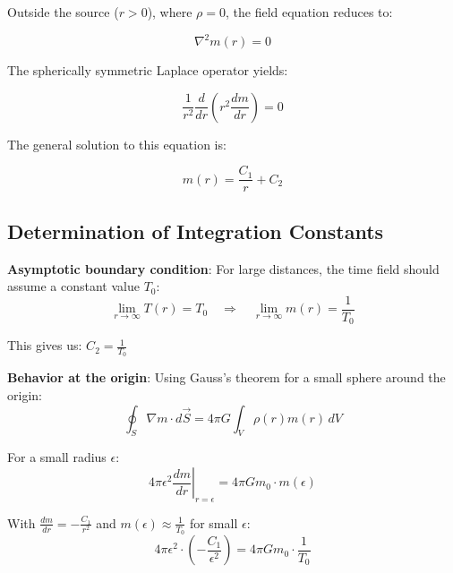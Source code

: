\documentclass[12pt,a4paper]{article}
\begin{document}
	Outside the source ($r > 0$), where $\rho = 0$, the field equation reduces to:
	
	\begin{equation}
		\nabla^2 m(r) = 0
	\end{equation}
	
	The spherically symmetric Laplace operator \citep{jackson1998,griffiths1999} yields:
	
	\begin{equation}
		\frac{1}{r^2}\frac{d}{dr}\left(r^2 \frac{dm}{dr}\right) = 0
	\end{equation}
	
	The general solution to this equation is:
	
	\begin{equation}
		m(r) = \frac{C_1}{r} + C_2
	\end{equation}
	
	\subsection{Determination of Integration Constants}
	\label{subsec:integration_constants}
	
	\textbf{Asymptotic boundary condition}: For large distances, the time field should assume a constant value $T_0$:
	\begin{equation}
		\lim_{r \to \infty} T(r) = T_0 \quad \Rightarrow \quad \lim_{r \to \infty} m(r) = \frac{1}{T_0}
	\end{equation}
	
	This gives us: $C_2 = \frac{1}{T_0}$
	
	\textbf{Behavior at the origin}: Using Gauss's theorem \citep{griffiths1999,jackson1998} for a small sphere around the origin:
	\begin{equation}
		\oint_S \nabla m \cdot d\vec{S} = 4\pi G \int_V \rho(r) m(r) \, dV
	\end{equation}
	
	For a small radius $\epsilon$:
	\begin{equation}
		4\pi \epsilon^2 \left.\frac{dm}{dr}\right|_{r=\epsilon} = 4\pi G m_0 \cdot m(\epsilon)
	\end{equation}
	
	With $\frac{dm}{dr} = -\frac{C_1}{r^2}$ and $m(\epsilon) \approx \frac{1}{T_0}$ for small $\epsilon$:
	\begin{equation}
		4\pi \epsilon^2 \cdot \left(-\frac{C_1}{\epsilon^2}\right) = 4\pi G m_0 \cdot \frac{1}{T_0}
	\end{equation}
	
\end{document}

